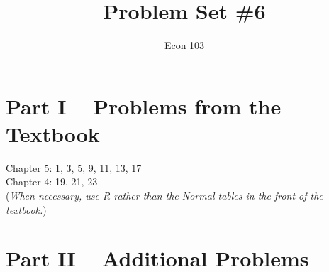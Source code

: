 \documentclass[addpoints,12pt]{exam}
\title{Problem Set \#6}
\author{Econ 103}
\date{}
\begin{document}
\maketitle

\section*{Part I -- Problems from the Textbook}
Chapter 5: 1, 3, 5, 9, 11, 13, 17\\
Chapter 4: 19, 21, 23 \\
(\emph{When necessary, use R rather than the Normal tables in the front of the textbook.})



\section*{Part II -- Additional Problems}
\end{document}
